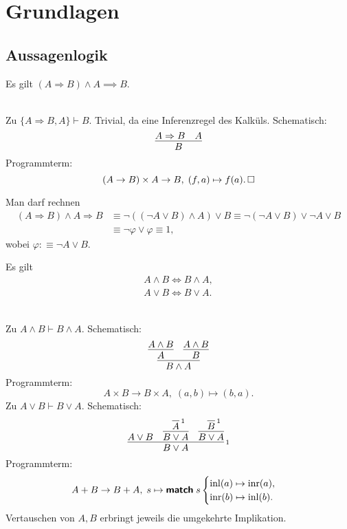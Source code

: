 
\chapter{Grundlagen}
\section{Aussagenlogik}

\begin{Satz}
Es gilt $(A\Rightarrow B)\land A \implies B$.
\end{Satz}
\begin{Beweis}\\
Zu $\{A\Rightarrow B, A\}\vdash B$. Trivial, da eine Inferenzregel des Kalküls. Schematisch:
\[\infer{B}{A\Rightarrow B & A}\]
Programmterm:
\[(A\to B)\times A\to B,\; (f, a)\mapsto f(a).\,\square\]
\end{Beweis}

\begin{Beweis}
Man darf rechnen
\begin{align*}
(A\Rightarrow B)\land A \Rightarrow B &\equiv
\neg ((\neg A\lor B)\land A) \lor B
\equiv\neg (\neg A\lor B) \lor \neg A \lor B\\
&\equiv \neg\varphi\lor\varphi\equiv 1,
\end{align*}
wobei $\varphi :\equiv \neg A\lor B$.\;\qedsymbol
\end{Beweis}

\begin{Satz}%
\label{bool-cl}
Es gilt
\begin{gather}
A\land B \iff B\land A,\\
A\lor B \iff B\lor A.
\end{gather}
\end{Satz}
\begin{Beweis}\\
Zu $A\land B\vdash B\land A$. Schematisch:
\[\infer{B\land A}{
   \infer{A}{A\land B}
   & \infer{B}{A\land B}
}\]
Programmterm:
\[A\times B\to B\times A,\; (a,b)\mapsto (b,a).\]
Zu $A\lor B\vdash B\lor A$. Schematisch:
\[\infer[\infernote{1}]{B\lor A}{
  A\lor B
  & \infer{B\lor A}{\infer[\infernote{1}]{A}{}}
  & \infer{B\lor A}{\infer[\infernote{1}]{B}{}}
}\]
Programmterm:
\[A+B\to B+A,\; s\mapsto\text{{\normalfont\sffamily\bfseries match}}\; s\begin{cases}
\operatorname{inl}(a)\mapsto \operatorname{inr}(a),\\
\operatorname{inr}(b)\mapsto \operatorname{inl}(b).
\end{cases}\]
Vertauschen von $A,B$ erbringt jeweils die umgekehrte Implikation.\;\qedsymbol
\end{Beweis}


